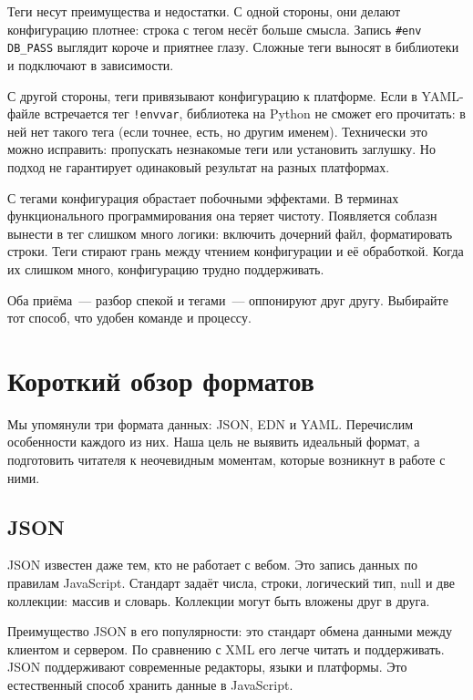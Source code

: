 Теги несут преимущества и недостатки. С одной стороны, они делают конфигурацию
плотнее: строка с тегом несёт больше смысла. Запись \verb|#env DB_PASS|
выглядит короче и приятнее глазу. Сложные теги выносят в библиотеки и подключают
в зависимости.

С другой стороны, теги привязывают конфигурацию к платформе. Если в YAML-файле
встречается тег \verb|!envvar|, библиотека на Python не сможет его прочитать:
в ней нет такого тега (если точнее, есть, но другим именем). Технически это
можно исправить: пропускать незнакомые теги или установить заглушку. Но подход
не гарантирует одинаковый результат на разных платформах.

С тегами конфигурация обрастает побочными эффектами. В терминах функционального
программирования она теряет чистоту. Появляется соблазн вынести в тег слишком
много логики: включить дочерний файл, форматировать строки. Теги стирают грань
между чтением конфигурации и её обработкой. Когда их слишком много, конфигурацию
трудно поддерживать.

Оба приёма~--- разбор спекой и тегами~--- оппонируют друг другу. Выбирайте тот
способ, что удобен команде и процессу.

\section{Короткий обзор форматов}

Мы упомянули три формата данных: JSON, EDN и YAML. Перечислим особенности
каждого из них. Наша цель не выявить идеальный формат, а подготовить читателя к
неочевидным моментам, которые возникнут в работе с ними.

\subsection{JSON}


JSON известен даже тем, кто не работает с вебом. Это запись данных по правилам
JavaScript. Стандарт задаёт числа, строки, логический тип, null и две коллекции:
массив и словарь. Коллекции могут быть вложены друг в друга.


Преимущество JSON в его популярности: это стандарт обмена данными между
клиентом и сервером. По сравнению с XML его легче читать и поддерживать. JSON
поддерживают современные редакторы, языки и платформы. Это естественный способ
хранить данные в JavaScript.

